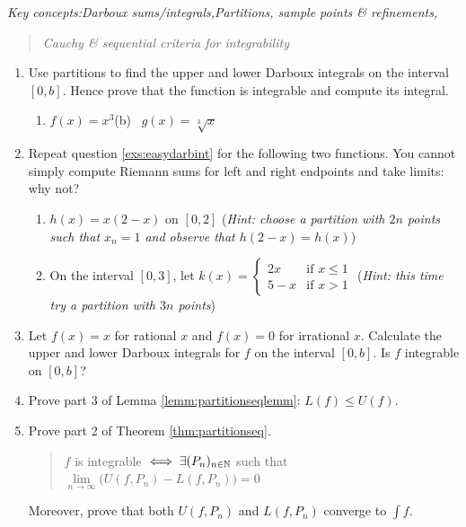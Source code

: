 \begin{exercises}
	\emph{Key concepts:\quad Darboux sums/integrals,\qquad Partitions, sample points \& refinements,}
	\begin{quote}
		\emph{Cauchy \& sequential criteria for integrability}
	\end{quote}
	
	\begin{enumerate}
		\item\label{exs:easydarbint} Use partitions to find the upper and lower Darboux integrals on the interval $[0,b]$. Hence prove that the function is integrable and compute its integral.
		\begin{enumerate}
		  \item $f(x)=x^3$\qquad\qquad\qquad (b) \ $g(x)=\sqrt[3]{x}$%
		\end{enumerate}
		
		
		\item Repeat question \ref*{exs:easydarbint} for the following two functions. You cannot simply compute Riemann sums for left and right endpoints and take limits: why not?
		\begin{enumerate}  
		  \item $h(x)=x(2-x)$ on $[0,2]$\smallbreak
		  (\emph{Hint: choose a partition with $2n$ points such that $x_n=1$ and observe that $h(2-x)=h(x)$})
		  
		  \item On the interval $[0,3]$, let $k(x)=\begin{cases}
		  2x&\text{if }x\le 1\\
		 	5-x&\text{if }x>1
		  \end{cases}$\smallbreak
		  (\emph{Hint: this time try a partition with $3n$ points})
		\end{enumerate}
	
	
	  \item Let $f(x)=x$ for rational $x$ and $f(x)=0$ for irrational $x$. Calculate the upper and lower Darboux integrals for $f$ on the interval $[0,b]$. Is $f$ integrable on $[0,b]$?
	
	    
		\item Prove part 3 of Lemma \ref{lemm:partitionseqlemm}: $L(f)\le U(f)$.
	
	
		\item Prove part 2 of Theorem \ref{thm:partitionseq}.
	 	\begin{quote}
	 		$f$ is integrable $\iff\exists (P_n)_{n\in\mathbb{N}}$ such that $\lim\limits_{n\to\infty}\bigl(U(f,P_n)-L(f,P_n)\bigr) =0$
	 	\end{quote}
	 	Moreover, prove that both $U(f,P_n)$ and $L(f,P_n)$ converge to $\int f$.
		

\end{enumerate}
\end{exercises}
